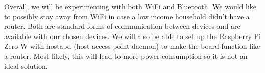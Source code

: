 	Overall, we will be experimenting with both WiFi and Bluetooth. We would like to possibly stay away from WiFi in case a low income household didn’t have a router. Both are standard forms of communication between devices and are available with our chosen devices. We will also be able to set up the Raspberry Pi Zero W with hostapd (host access point daemon) to make the board function like a router. Most likely, this will lead to more power consumption so it is not an ideal solution.
